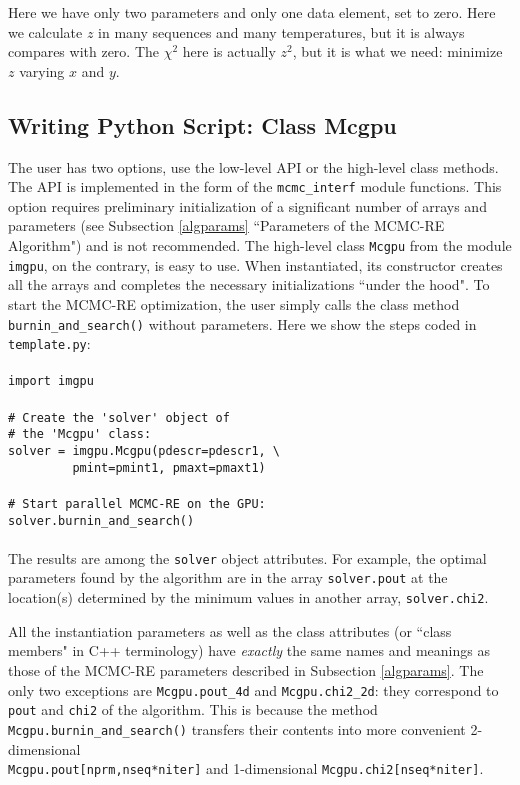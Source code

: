 \documentclass[preprint2]{aastex}
\begin{document}
Here we have only two parameters and only one data element, set to zero. Here we calculate $z$ in many sequences and many temperatures, but it is always compares with zero. The $\chi^2$ here is actually 
$z^2$, but it is what we need: minimize $z$ varying $x$ and $y$. 

\subsection{Writing Python Script: Class Mcgpu}

The user has two options, use the low-level API or the high-level class methods.
The API is implemented in the form of the \verb|mcmc_interf| module functions. 
This option requires preliminary initialization of a significant number of arrays
and parameters (see Subsection \ref{algparams} ``Parameters of the MCMC-RE Algorithm") and is
not recommended. The high-level class \verb|Mcgpu| from the module \verb|imgpu|,
on the contrary, is easy to use. When instantiated, its constructor creates all
the arrays and completes the necessary initializations ``under the hood". To
start the MCMC-RE optimization, the user simply calls the class method
\verb|burnin_and_search()| without parameters. Here we show the steps coded in
\verb|template.py|: \\\\
\verb|import imgpu| \\\\
\verb|# Create the 'solver' object of| \\
\verb|# the 'Mcgpu' class:| \\
\verb|solver = imgpu.Mcgpu(pdescr=pdescr1, \| \\
\verb|         pmint=pmint1, pmaxt=pmaxt1)| \\\\
\verb|# Start parallel MCMC-RE on the GPU:| \\
\verb|solver.burnin_and_search()| \\\\
The results are among the \verb|solver| object attributes. For example, the
optimal parameters found by the algorithm are in the array \verb|solver.pout|
at the location(s) determined by the minimum values in another array, 
\verb|solver.chi2|.  

All the instantiation parameters as well as the class attributes (or 
``class members" in C++ terminology) have \emph{exactly} the same names 
and meanings as those of the MCMC-RE parameters described in Subsection  \ref{algparams}. 
The only two exceptions are \verb|Mcgpu.pout_4d| and \verb|Mcgpu.chi2_2d|:
they correspond to \verb|pout| and \verb|chi2| of the algorithm. This is
because the method \\
\verb|Mcgpu.burnin_and_search()| transfers their contents
into more convenient 2-dimensional \\
\verb|Mcgpu.pout[nprm,nseq*niter]|
and 1-dimensional \verb|Mcgpu.chi2[nseq*niter]|. 
\end{document}
